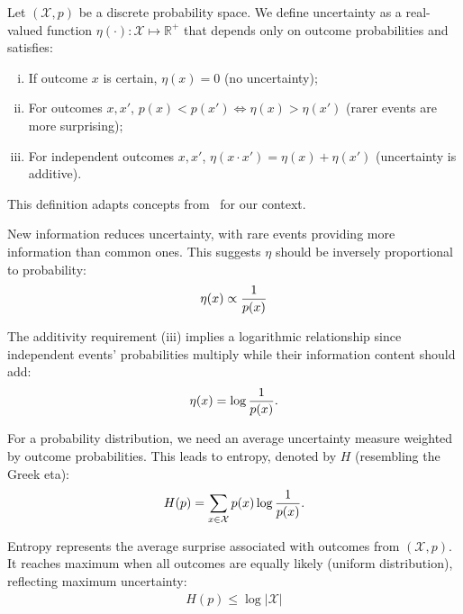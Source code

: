 \begin{definition}
	Let $(\mathcal{X}, p)$ be a discrete probability space. We define \textnormal{\sffamily uncertainty} as a real-valued function $\eta(\cdot): \mathcal{X} \mapsto \mathbb{R}^+$ that depends only on outcome probabilities and satisfies:
	\begin{enumerate}[(i)]
		\item If outcome $x$ is certain, $\eta(x) = 0$ (no uncertainty);
		\item For outcomes $x, x'$, $p(x) < p(x') \iff \eta(x) > \eta(x')$ (rarer events are more surprising);
		\item For independent outcomes $x, x'$, $\eta(x \cdot x') = \eta(x) + \eta(x')$ (uncertainty is additive).
	\end{enumerate}
\end{definition}
\begin{remark}
	This definition adapts concepts from~\cite{ref:martin-2011} for our context.
\end{remark}

New information reduces uncertainty, with rare events providing more information than common ones. This suggests $\eta$ should be inversely proportional to probability:
\begin{align}
	\label{eq:eta-1}
	\eta(x) \propto {1 \over p(x)}
\end{align}

The additivity requirement (iii) implies a logarithmic relationship since independent events' probabilities multiply while their information content should add:
\begin{align}
	\label{eq:eta-3}
	\eta(x) = \log{1 \over p(x)}.
\end{align}

For a probability distribution, we need an average uncertainty measure weighted by outcome probabilities. This leads to entropy, denoted by $H$ (resembling the Greek eta):
\begin{align}
	\label{eq:eta-almost}
	H(p) = \sum_{x \in \mathcal{X}} p(x) \log{1 \over p(x)}.
\end{align}

Entropy represents the average surprise associated with outcomes from $(\mathcal{X}, p)$. It reaches maximum when all outcomes are equally likely (uniform distribution), reflecting maximum uncertainty:
\begin{align}
	\label{eq:eta-2}
	H(p) \leq \log{|\mathcal{X}|}
\end{align}

